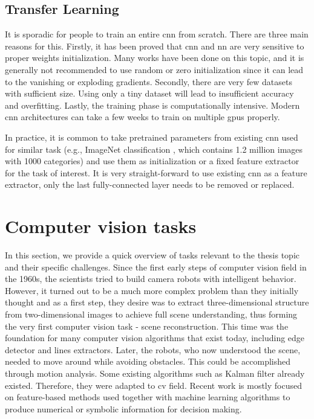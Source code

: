     \subsection{Transfer Learning}
        It is sporadic for people to train an entire \gls{cnn} from scratch. There are three main reasons for this. Firstly, it has been proved that \gls{cnn} and \gls{nn} are very sensitive to proper weights initialization. Many works have been done on this topic, and it is generally not recommended to use random or zero initialization since it can lead to the vanishing or exploding gradients. Secondly, there are very few datasets with sufficient size. Using only a tiny dataset will lead to insufficient accuracy and overfitting. Lastly, the training phase is computationally intensive. Modern \gls{cnn} architectures can take a few weeks to train on multiple \gls{gpu}s properly.

        In practice, it is common to take pretrained parameters from existing \gls{cnn} used for similar task (e.g., ImageNet classification \cite{russakovsky2015imagenet}, which contains 1.2 million images with 1000 categories) and use them as initialization or a fixed feature extractor for the task of interest. It is very straight-forward to use existing \gls{cnn} as a feature extractor, only the last fully-connected layer needs to be removed or replaced.
        
\section{Computer vision tasks}
    In this section, we provide a quick overview of tasks relevant to the thesis topic and their specific challenges. Since the first early steps of computer vision field in the 1960s, the scientists tried to build camera robots with intelligent behavior. However, it turned out to be a much more complex problem than they initially thought and as a first step, they desire was to extract three-dimensional structure from two-dimensional images to achieve full scene understanding, thus forming the very first computer vision task - scene reconstruction. This time was the foundation for many computer vision algorithms that exist today, including edge detector and lines extractors. Later, the robots, who now understood the scene, needed to move around while avoiding obstacles. This could be accomplished through motion analysis. Some existing algorithms such as Kalman filter already existed. Therefore, they were adapted to \gls{cv} field. Recent work is mostly focused on feature-based methods used together with machine learning algorithms to produce numerical or symbolic information for decision making. 
    
